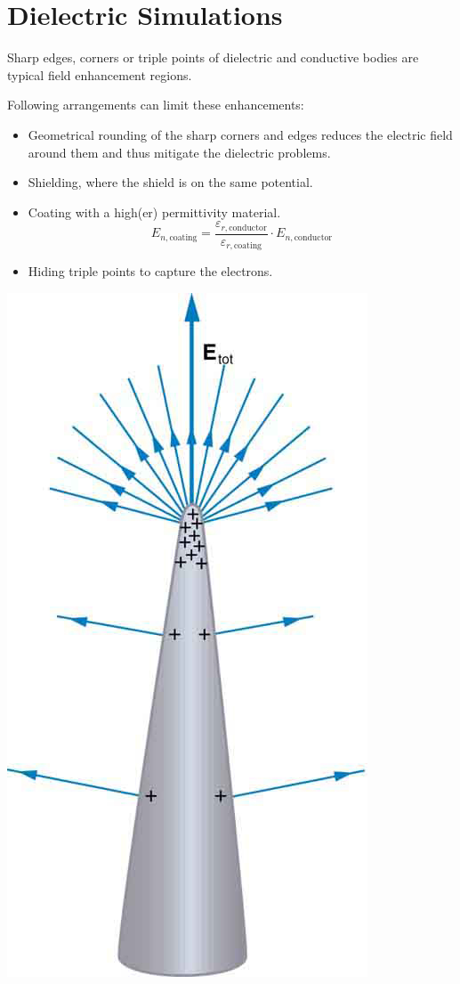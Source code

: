 \section{Dielectric Simulations}

Sharp edges, corners or triple points of dielectric and conductive bodies are typical field enhancement regions. \newline
\begin{minipage}[lt]{15cm}
	Following arrangements can limit these enhancements:
	\begin{itemize}
		\item Geometrical rounding of the sharp corners and edges reduces the electric field around them and thus mitigate the dielectric problems.
		\item Shielding, where the shield is on the same potential.
		\item Coating with a high(er) permittivity material. 
		\begin{equation*}
			E_{n,\textrm{coating}} = \frac{\varepsilon_{r,\textrm{conductor}}}{\varepsilon_{r,\textrm{coating}}} \cdot E_{n,\textrm{conductor}}
		\end{equation*}
		\item Hiding triple points to capture the electrons.
	\end{itemize}
\end{minipage}
\begin{minipage}[rt]{4cm}
	\includegraphics[width=.7\textwidth]{./images/fieldEnhancement.jpeg}
\end{minipage}
